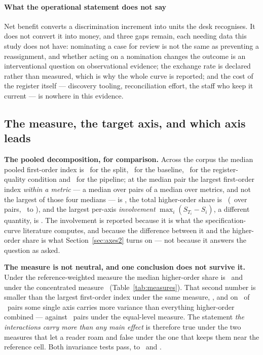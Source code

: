 \paragraph{What the operational statement does not say} Net benefit converts a
discrimination increment into units the desk recognises. It does not convert
it into money, and three gaps remain, each needing data this study does not
have: nominating a case for review is not the same as preventing a
reassignment, and whether acting on a nomination changes the outcome is an
interventional question on observational evidence; the exchange rate is
declared rather than measured, which is why the whole curve is reported; and
the cost of the register itself --- discovery tooling, reconciliation effort,
the staff who keep it current --- is nowhere in this evidence.

\subsection{The measure, the target axis, and which axis leads}
\label{app:measures}


\textbf{The pooled decomposition, for comparison.} Across the corpus the
median pooled first-order index is \sSplitPct\ for the split, \sRungPct\ for
the baseline, \sQualityPct\ for the register-quality condition and
\sLearnerPct\ for the pipeline; at the median pair the largest first-order
index \emph{within a metric} --- a median over pairs of a median over
metrics, and not the largest of those four medians --- is
\largestFirstOrderPct, the total higher-order share is \interactionTotalPct\
(\interactionTotalCI\ over pairs, \interactionMinPct\ to
\interactionMaxPct), and the largest per-axis \emph{involvement}
$\max_i (S_{T_i} - S_i)$, a different quantity, is \largestInvolvementPct.
The involvement is reported because it is what the specification-curve
literature computes, and because the difference between it and the
higher-order share is what Section~\ref{sec:axes2} turns on --- not because it
answers the question as asked.



\textbf{The measure is not neutral, and one conclusion does not survive it.}
Under the reference-weighted measure the median higher-order share is
\interactionTotalReferencePct\ and under the concentrated measure
\interactionTotalConcentratedPct\ (Table~\ref{tab:measures}). That second
number is smaller than the largest first-order index under the same measure,
\concentratedFirstOrderPct, and on \nConcentratedExceeds\ of \nPairs\ pairs
some single axis carries more variance than everything higher-order combined
--- against \nEqualExceeds\ pairs under the equal-level measure. The statement
\emph{the interactions carry more than any main effect} is therefore true
under the two measures that let a reader roam and false under the one that
keeps them near the reference cell. Both invariance tests pass, to
\invarianceDuplicateShift\ and \invarianceGridShift.

